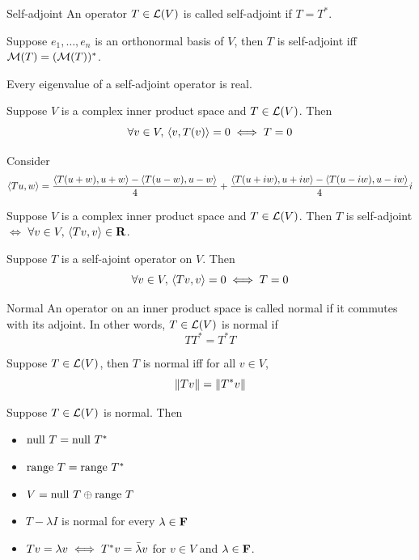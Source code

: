 \documentclass[12pt,a4paper]{article}
\begin{document}
    \begin{defi}{Self-adjoint}
        An operator $T\in\mathcal{L}(V)$ is called self-adjoint if $T=T^*$. 
    \end{defi}
    \begin{remark}
        Suppose $e_1,\dots,e_n$ is an orthonormal basis of $V$, then $T$ is self-adjoint iff $\mathcal{M}(T)=(\mathcal{M}(T))^*$.
    \end{remark}
    \hfill

    \begin{prop}
        Every eigenvalue of a self-adjoint operator is real.
    \end{prop}
    \hfill

    \begin{prop}
        Suppose $V$ is a complex inner product space and $T\in\mathcal{L}(V)$. Then
        $$
        \forall v\in V,\,\langle v,T(v)\rangle=0\iff T=0
        $$
    \end{prop}
    \begin{remark}
        Consider
        $$
        \langle Tu,w\rangle=\frac{\langle T(u+w),u+w\rangle-\langle T(u-w),u-w\rangle}{4}+\frac{\langle T(u+iw),u+iw\rangle-\langle T(u-iw),u-iw\rangle}{4}i
        $$
    \end{remark}
    \hfill

    \begin{prop}\label{7.10}
        Suppose $V$ is a complex inner product space and $T\in\mathcal{L}(V)$. Then $T$ is self-adjoint $\iff$ $\forall v\in V,\,\langle Tv,v\rangle\in\mathbf{R}$.
    \end{prop}
    \hfill

    \begin{prop}
        Suppose $T$ is a self-ajoint operator on $V$. Then
        $$
        \forall v\in V,\,\langle Tv,v\rangle=0\iff T=0
        $$
    \end{prop}
    \hfill

    \begin{defi}{Normal}
        An operator on an inner product space is called normal if it commutes with its adjoint. In other words, $T\in\mathcal{L}(V)$ is normal if
        $$
        TT^*=T^*T
        $$
    \end{defi}
    \hfill

    \begin{prop}\label{7.13}
        Suppose $T\in\mathcal{L}(V)$, then $T$ is normal iff for all $v\in V$,
        $$
        \left\lVert Tv\right\rVert=\left\lVert T^*v\right\rVert
        $$
    \end{prop}
    \hfill

    \begin{prop}
        Suppose $T\in\mathcal{L}(V)$ is normal. Then
        \begin{itemize}
            \item $\operatorname{null\,} T=\operatorname{null\,} T^*$
            \item $\operatorname{range\,} T=\operatorname{range\,} T^*$
            \item $V=\operatorname{null\,} T\oplus\operatorname{range\,} T$
            \item $T-\lambda I$ is normal for every $\lambda\in\mathbf{F}$
            \item $Tv=\lambda v\iff T^*v=\Bar{\lambda}v$ for $v\in V$ and $\lambda\in\mathbf{F}$.
        \end{itemize}
    \end{prop}
    \hfill
\end{document}
